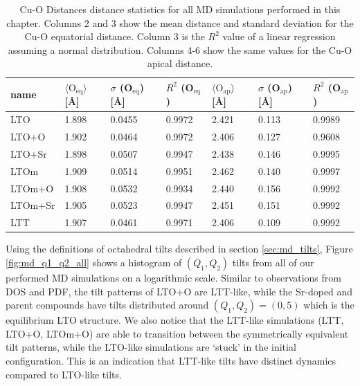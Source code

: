 \begin{table}
	\centering
	\caption{Cu-O Distances distance statistics for all MD simulations performed in this chapter. Columns 2 and 3 show the mean distance and standard deviation for the Cu-O equatorial distance. Column 3 is the $R^2$ value of a linear regression assuming a normal distribution. Columns 4-6 show the same values for the Cu-O apical distance.}
	\label{tab:md_cu_o_distances}
	\begin{tabular}{lllllll}
		\toprule
			name &   $\langle \text{O}_\text{eq} \rangle $ [\AA]  & $\sigma$ (O$_\text{eq}$) [\AA] &  $R^2$ (O$_\text{eq}$) & $ \langle \text{O}_\text{ap} \rangle$ [\AA] & $\sigma$ (O$_\text{ap}$) [\AA] &  $R^2$ (O$_\text{ap}$) \\
		\midrule
			 LTO &  1.898 &  0.0455 &  0.9972 &  2.421 &   0.113 &  0.9989 \\
		   LTO+O &  1.902 &  0.0464 &  0.9972 &  2.406 &   0.127 &  0.9608 \\
		  LTO+Sr &  1.898 &  0.0507 &  0.9947 &  2.438 &   0.146 &  0.9995 \\
			LTOm &  1.909 &  0.0514 &  0.9951 &  2.462 &   0.140 &  0.9997 \\
		  LTOm+O &  1.908 &  0.0532 &  0.9934 &  2.440 &   0.156 &  0.9992 \\
		 LTOm+Sr &  1.905 &  0.0523 &  0.9947 &  2.451 &   0.151 &  0.9992 \\
			 LTT &  1.907 &  0.0461 &  0.9971 &  2.406 &   0.109 &  0.9992 \\
		\bottomrule
		\end{tabular}
\end{table}

Using the definitions of octahedral tilts described in section \ref{sec:md_tilts}, Figure \ref{fig:md_q1_q2_all} shows a histogram of $(Q_1, Q_2)$ tilts from all of our performed MD simulations on a logarithmic scale. Similar to observations from DOS and PDF, the tilt patterns of LTO+O are LTT-like, while the Sr-doped and parent compounds have tilts distributed around $(Q_1, Q_2) = (0,5)$ which is the equilibrium LTO structure. We also notice that the LTT-like simulations (LTT, LTO+O, LTOm+O) are able to transition between the  symmetrically equivalent tilt patterns, while the LTO-like simulations are `stuck' in the initial configuration. This is an indication that LTT-like tilts have distinct dynamics compared to LTO-like tilts.

